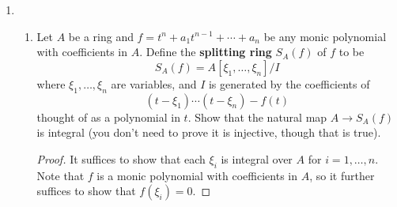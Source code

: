 \documentclass[10pt]{article}
\renewcommand{\k}{\mbf k}
\DeclareMathOperator*{\Frac}{\mathrm{Frac}}
\newcommand{\wt}{\widetilde}
\newcommand{\mbf}[1]{\mathbf{#1}}
\newcommand{\into}{\hookrightarrow}
\newcommand{\1}{\mbf 1}
\newcommand{\2}{\mbf 2}
\newcommand{\3}{\mbf 3}
\newcommand{\4}{\mbf 4}
\newcommand{\5}{\mbf 5}
\newcommand{\6}{\mbf 6}
\newcommand{\7}{\mbf 7}
\newcommand{\8}{\mbf 8}
\newcommand{\9}{\mbf 9}
\newcommand{\0}{\mbf 0}
\renewcommand{\k}{\mbf k}
\renewcommand{\(}{\left(}
\renewcommand{\)}{\right)}
\begin{document}
\begin{enumerate}[label=(\arabic*)]
\begin{proof}
        Therefore, by the universal property of a quotient there exists an embedding $\wt\varphi: A\into\k[t]$ with image $\k[t^2-1,t(t^2-1)]$. Note that $\k[t]\supseteq\k[t^2-1,t(t^2-1)]$ is an integral extension, as $t$ is a root of the monic polynomial $z^2-(t^2-1)-1\in \k[t^2-1,t(t^2-1)][z]$. Furthermore, note that $\Frac\k[t^2-1,t(t^2-1)]=\Frac\k[t]$ (as $t(t^2-1)/(t^2-1)=t$ belongs to $\Frac\k[t^2-1,t(t^2-1)]$), and $\k[t]$ is a UFD, so that it is integrally closed in its field of fractions. Hence, $\k[t]$ is the normalization of $\k[t^2-1,t(t^2-1)]\cong A$. By the universal properry of the fraction field, there exists a morphism $\psi:\Frac A\to\k(t)$ sending $p/q\mapsto\wt\varphi(p)/\wt\varphi(q)$ such that the following diagram commutes.
        \[\begin{tikzcd}
            & {\k[t]} & {\k(t)} \\
            A \\
            & {A[\tfrac yx]} & {\Frac A}
            \arrow["\wt\varphi", hook, from=2-1, to=1-2]
            \arrow[hook, from=1-2, to=1-3]
            \arrow[hook, from=2-1, to=3-2]
            \arrow[hook, from=3-2, to=3-3]
            \arrow["\psi"', dashed, hook, from=3-3, to=1-3]
        \end{tikzcd}\]
        It is straightforward to see that given any $f(x,y,y/x)\in A[\tfrac yx]$, that $\psi(f)=f(t^2-1,t(t^2-1),t)\in\k[t]$. Furthermore, given any $f(t)\in\k[t]$, we have that $f(y/x)\in A[\tfrac yx]$ maps to $f$ via $\psi$, so that $\psi|_{A[\tfrac yx]}:A[\tfrac yx]\to\k[t]$ is both injective and surjective (injective because $\psi$ is a nontrivial morphism of fields), hence, an isomorphism. It follows that $A[\tfrac yx]$ is the normalization of $A$.
    \end{proof}

    \item \begin{enumerate}[label=(\alph*)]
        \item Let $A$ be a ring and $f=t^n+a_1t^{n-1}+\cdots+a_n$ be any monic polynomial with coefficients in $A$. Define the \textbf{splitting ring} $S_A(f)$ of $f$ to be
        \[S_A(f)=A[\xi_1,\ldots,\xi_n]/I\]
        where $\xi_1,\ldots,\xi_n$ are variables, and $I$ is generated by the coefficients of
        \[(t-\xi_1)\cdots(t-\xi_n)-f(t)\]
        thought of as a polynomial in $t$. Show that the natural map $A\to S_A(f)$ is integral (you don't need to prove it is injective, though that is true).
        \begin{proof}
            It suffices to show that each $\xi_i$ is integral over $A$ for $i=1,\ldots,n$. Note that $f$ is a monic polynomial with coefficients in $A$, so it further suffices to show that $f(\xi_i)=0$. 


\end{proof}
\end{enumerate}
\end{enumerate}
\end{document}
